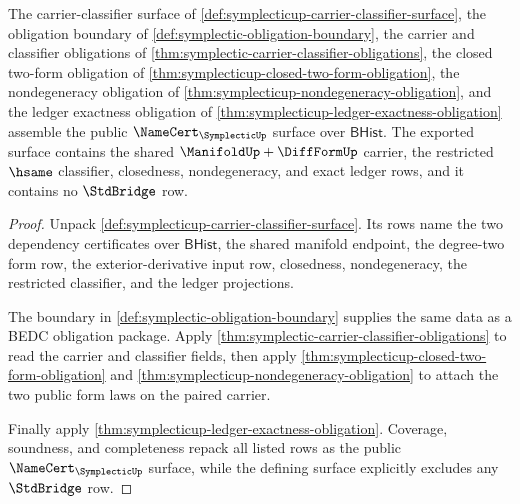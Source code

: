 \begin{theorem}
\label{thm:symplecticup-public-namecert-export}
The carrier-classifier surface of \autoref{def:symplecticup-carrier-classifier-surface}, the obligation boundary of \autoref{def:symplectic-obligation-boundary}, the carrier and classifier obligations of \autoref{thm:symplectic-carrier-classifier-obligations}, the closed two-form obligation of \autoref{thm:symplecticup-closed-two-form-obligation}, the nondegeneracy obligation of \autoref{thm:symplecticup-nondegeneracy-obligation}, and the ledger exactness obligation of \autoref{thm:symplecticup-ledger-exactness-obligation} assemble the public $\NameCert_{\SymplecticUp}$ surface over $\mathsf{BHist}$. The exported surface contains the shared $\ManifoldUp+\DiffFormUp$ carrier, the restricted $\hsame$ classifier, closedness, nondegeneracy, and exact ledger rows, and it contains no $\StdBridge$ row.
\end{theorem}
\begin{proof}
Unpack \autoref{def:symplecticup-carrier-classifier-surface}. Its rows name the two dependency certificates over $\mathsf{BHist}$, the shared manifold endpoint, the degree-two form row, the exterior-derivative input row, closedness, nondegeneracy, the restricted classifier, and the ledger projections.

The boundary in \autoref{def:symplectic-obligation-boundary} supplies the same data as a BEDC obligation package. Apply \autoref{thm:symplectic-carrier-classifier-obligations} to read the carrier and classifier fields, then apply \autoref{thm:symplecticup-closed-two-form-obligation} and \autoref{thm:symplecticup-nondegeneracy-obligation} to attach the two public form laws on the paired carrier.

Finally apply \autoref{thm:symplecticup-ledger-exactness-obligation}. Coverage, soundness, and completeness repack all listed rows as the public $\NameCert_{\SymplecticUp}$ surface, while the defining surface explicitly excludes any $\StdBridge$ row.
\end{proof}

